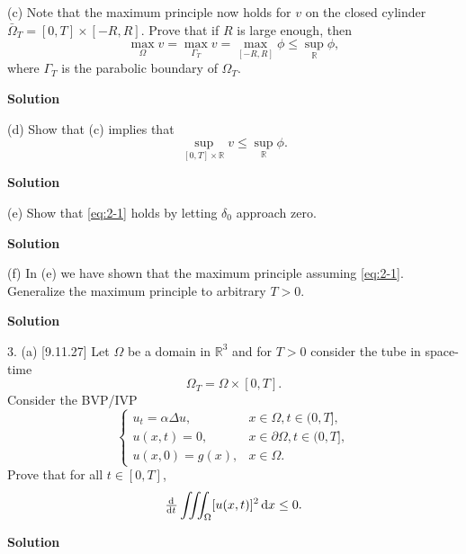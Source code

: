 \documentclass{article}
\begin{document}
(c) Note that the maximum principle now holds for $v$ on the closed
cylinder $\bar{\Omega}_T = [0, T] \times [-R, R]$. Prove that if $R$ is
large enough, then
%
\begin{equation*}
    \max_\Omega v = \max_{\Gamma_T} v = \max_{[-R, R]} \phi \leq \sup_\mathbb{R} \phi
    ,
\end{equation*}
%
where $\Gamma_T$ is the parabolic boundary of $\Omega_T$.

\textbf{Solution}

\vspace{5mm}

(d) Show that (c) implies that
%
\begin{equation*}
    \sup_{[0, T] \times \mathbb{R}} v \leq \sup_\mathbb{R} \phi
    .
\end{equation*}

\textbf{Solution}

\vspace{5mm}

(e) Show that \eqref{eq:2-1} holds by letting $\delta_0$ approach zero.

\textbf{Solution}

\vspace{5mm}

(f) In (e) we have shown that the maximum principle assuming
\eqref{eq:2-1}. Generalize the maximum principle to arbitrary $T > 0$.

\textbf{Solution}

\newpage

3. (a) [9.11.27] Let $\Omega$ be a domain in $\mathbb{R}^3$ and for
$T > 0$ consider the tube in space-time
%
\begin{equation*}
    \Omega_T = \Omega \times [0, T]
    .
\end{equation*}
%
Consider the BVP/IVP
%
\begin{equation*}
    \begin{cases}
        u_t = \alpha \Delta u, & x \in \Omega, t \in (0, T], \\
        u(x, t) = 0, & x \in \partial \Omega, t \in (0, T], \\
        u(x, 0) = g(x), & x \in \Omega.
    \end{cases}
\end{equation*}
%
Prove that for all $t \in [0, T]$,
%
\begin{equation*}
    \od{}{t} \iiint_\Omega [u(x, t)]^2 \dif x \leq 0
    .
\end{equation*}

\textbf{Solution}
\end{document}
